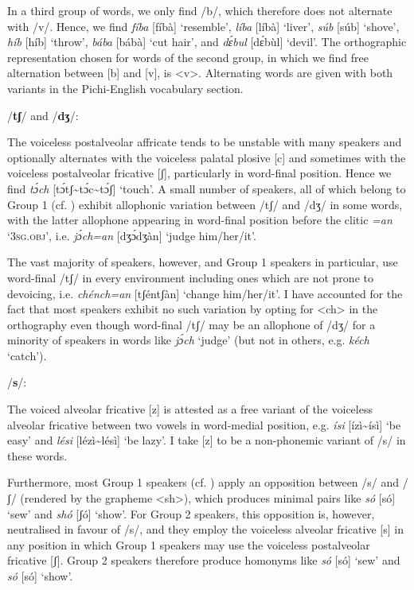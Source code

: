 In a third group of words, we only find /b/, which therefore does not alternate with /v/. Hence, we find \textit{fíba} [fíbà] ‘resemble’, \textit{líba} [líbà] ‘liver’, \textit{súb} [súb] ‘shove’, \textit{híb} [híb] ‘throw’, \textit{bába} [bábà] ‘cut hair’, and \textit{dɛ́bul} [dɛ́bùl] ‘devil’. The orthographic representation chosen for words of the second group, in which we find free alternation between [b] and [v], is <v>. Alternating words are given with both variants in the Pichi-English vocabulary section.


/\textbf{tʃ}/ and /\textbf{dʒ}/:

The voiceless postalveolar affricate tends to be unstable with many speakers and optionally alternates with the voiceless palatal plosive [c] and sometimes with the voiceless postalveolar fricative [ʃ], particularly in word-final position. Hence we find \textit{tɔ́ch} [tɔ́tʃ\textasciitilde tɔ́c\textasciitilde tɔ́ʃ] ‘touch’. A small number of speakers, all of which belong to Group 1 (cf. ) exhibit allophonic variation between /tʃ/ and /dʒ/ in some words, with the latter allophone appearing in word-final position before the clitic \textit{=an} ‘\textsc{3sg.obj}’, i.e. \textit{jɔ́ch=an} [dʒɔ́dʒàn] ‘judge him/her/it’. 


The vast majority of speakers, however, and Group 1 speakers in particular, use word-final /tʃ/ in every environment including ones which are not prone to devoicing, i.e. \textit{chénch=an} [tʃéntʃàn] ‘change him/her/it’. I have accounted for the fact that most speakers exhibit no such variation by opting for <ch> in the orthography even though word-final /tʃ/ may be an allophone of /dʒ/ for a minority of speakers in words like \textit{jɔ́ch} ‘judge’ (but not in others, e.g. \textit{kéch} ‘catch’).


/\textbf{s}/:

The voiced alveolar fricative [z] is attested as a free variant of the voiceless alveolar fricative between two vowels in word-medial position, e.g. \textit{ísi} [ízì{\textasciitilde}ísì] ‘be easy’ and \textit{lési} [lézì{\textasciitilde}lésì] ‘be lazy’. I take [z] to be a non-phonemic variant of /s/ in these words. 


Furthermore, most Group 1 speakers (cf. ) apply an opposition between /s/ and /ʃ/ (rendered by the grapheme <sh>), which produces minimal pairs like \textit{só} [só] ‘sew’ and \textit{shó} [ʃó] ‘show’. For Group 2 speakers, this opposition is, however, neutralised in favour of /s/, and they employ the voiceless alveolar fricative [s] in any position in which Group 1 speakers may use the voiceless postalveolar fricative [ʃ]. Group 2 speakers therefore produce homonyms like \textit{só} [só] ‘sew’ and \textit{só} [só] ‘show’.



